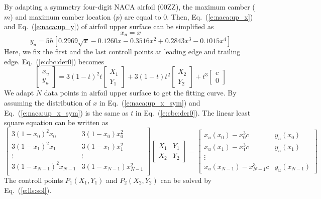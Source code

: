 \documentclass{turgon}
\begin{document}
By adapting a symmetry four-digit NACA airfoil ($\mathrm{00ZZ}$), the maximum
camber ($m$) and maximum camber location ($p$) are equal to $0$. Then,
Eq.~(\ref{e:naca:up_x}) and Eq.~(\ref{e:naca:up_y}) of airfoil upper surface
can be simplified as
\begin{equation}
    x_u = x
    \label{e:naca:up_x_sym}
\end{equation}
\begin{equation}
    y_u = 5h[0.2969\sqrt{x}-0.1260x-0.3516x^2+0.2843x^3-0.1015x^4]
    \label{e:naca:up_y_sym}
\end{equation}
Here, we fix the first and the last controll points at leading edge and
trailing edge. Eq.~(\ref{e:cbc:der0}) becomes
\begin{equation*}
    \begin{bmatrix} x_u \\ y_u \end{bmatrix}
        = 3(1-t)^2 t \begin{bmatrix} X_1 \\ Y_1 \end{bmatrix}
        + 3(1-t) t^2 \begin{bmatrix} X_2 \\ Y_2 \end{bmatrix}
        + t^3 \begin{bmatrix} c \\ 0 \end{bmatrix}
\end{equation*}
We adapt $N$ data points in airfoil upper surface to get the fitting curve.  By
assuming the distribution of $x$ in Eq.~(\ref{e:naca:up_x_sym}) and
Eq.~(\ref{e:naca:up_x_sym}) is the same as $t$ in Eq.~(\ref{e:cbc:der0}).  The
linear least square equation can be written as
\begin{equation*}
    \begin{bmatrix}
        3(1 - x_0)^2 x_0 & 3(1 - x_0) x_0^2 \\
        3(1 - x_1)^2 x_1 & 3(1 - x_1) x_1^2 \\
        \vdots & \vdots \\
        3(1 - x_{N-1})^2 x_{N-1} & 3(1 - x_{N-1}) x_{N-1}^2 \\
    \end{bmatrix}
    \begin{bmatrix}
        X_1 & Y_1 \\
        X_2 & Y_2
    \end{bmatrix}
    =
    \begin{bmatrix}
        x_u(x_0) - x_0^3 c & y_u(x_0) \\
        x_u(x_1) - x_1^3 c & y_u(x_1) \\
        \vdots \\
        x_u(x_{N-1}) - x_{N-1}^3 c & y_u(x_{N-1})
    \end{bmatrix}
\end{equation*}
The controll points $P_1(X_1, Y_1)$ and $P_2(X_2, Y_2)$ can be solved by
Eq.~(\ref{e:lls:sol}).
\end{document}
